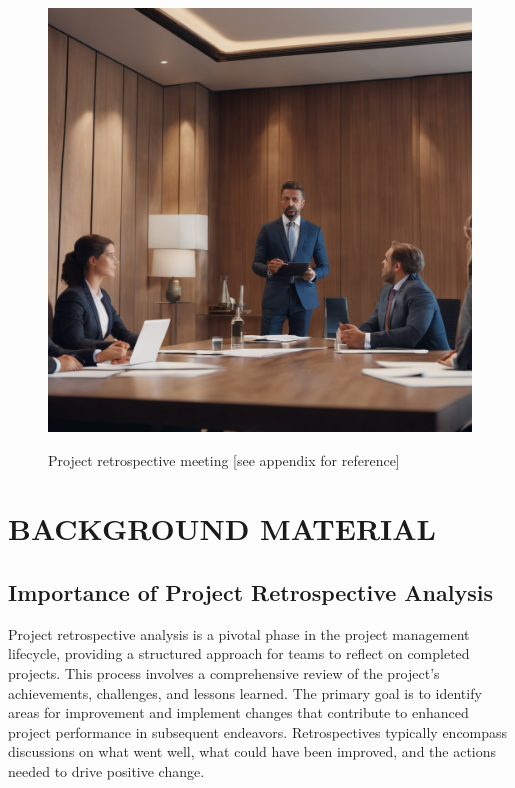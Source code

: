 \documentclass{article}
\begin{document}
\begin{figure}[H]
\caption{Project retrospective meeting [see appendix for reference]}
\includegraphics[width=\textwidth]{Project retrospective.png}
\label{fig: project meeting}
\end{figure}


\newpage

\section{BACKGROUND MATERIAL}
    
\subsection{Importance of Project Retrospective Analysis}
Project retrospective analysis is a pivotal phase in the project management lifecycle, providing a structured approach for teams to reflect on completed projects. This process involves a comprehensive review of the project's achievements, challenges, and lessons learned. The primary goal is to identify areas for improvement and implement changes that contribute to enhanced project performance in subsequent endeavors. Retrospectives typically encompass discussions on what went well, what could have been improved, and the actions needed to drive positive change. \cite{nelson2008project}\\
\end{document}
